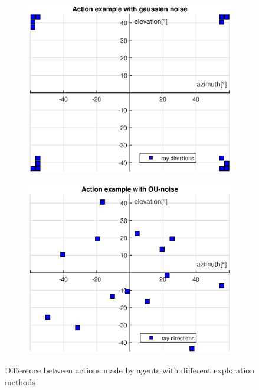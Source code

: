 \begin{figure}[H]
\begin{subfigure}[h]{0.5\linewidth}
\includegraphics[width=\linewidth]{fig/wrong_action.eps}
\end{subfigure}
\hfill
\begin{subfigure}[h]{0.5\linewidth}
\includegraphics[width=\linewidth]{fig/right_action.eps}
\end{subfigure}
\captionsetup{width=1\textwidth}
\caption{Difference between actions made by agents with different exploration methods}
\label{fig:expdiff}
\end{figure}

